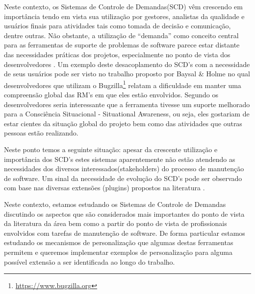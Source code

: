 \documentclass[12pt]{article}
\begin{document}
Neste contexto, os Sistemas de Controle de Demandas(SCD) vêm crescendo em importância tendo em vista sua utilização por gestores, analistas da qualidade e usuários finais para atividades tais como tomada de decisão e comunicação, dentre outras. Não obstante, a utilização de  ``demanda'' como conceito central para as ferramentas de suporte de problemas de software parece estar distante das necessidades práticas dos projetos, especialmente no ponto de vista dos desenvolvedores \cite{Baysal:2013:SAP:2486788.2486957}. Um exemplo deste desacoplamento do SCD's com a necessidade de seus usuários pode ser visto no trabalho proposto por Baysal \& Holme \cite{baysal2012qualitative} no qual desenvolvedores que utilizam o Bugzilla\footnote{\url{https://www.bugzilla.org}} relatam a dificuldade em manter uma compreensão global das RM's em que eles estão envolvidos. Segundo os desenvolvedores seria interessante que a ferramenta
tivesse um suporte melhorado para a Consciência Situacional - Situational Awareness, ou seja, eles gostariam de estar cientes da situação global do projeto bem como das atividades que outras pessoas estão realizando. 

Neste ponto temos a seguinte situação: apesar da crescente utilização e importância dos SCD's estes sistemas aparentemente não estão atendendo as necessidades dos diversos interessados(stakeholders) do processo de manutenção de software. Um sinal da necessidade de evolução do SCD's pode ser observado com base nas diversas extensões (plugins) propostos na literatura \cite{101186,Thung:2014:BIT:2635868.2661678,Kononenko:2014:DED:2591062.2591075}. 

Neste contexto, estamos estudando os Sistemas de Controle de Demandas discutindo os aspectos que são considerados mais importantes do ponto de vista da literatura da área bem como
a partir do ponto de vista de profissionais envolvidos com tarefas de manutenção de software. De forma particular estamos estudando os mecanismos de personalização que algumas destas ferramentas permitem e queremos implementar exemplos de personalização para alguma possível extensão a ser identificada ao longo do trabalho.
\end{document}
